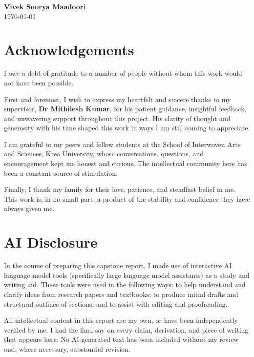 \documentclass[12pt, a4paper, oneside]{report}
\theoremstyle{plain}
\theoremstyle{definition}
\theoremstyle{remark}
\begin{document}
\vspace{3cm}

\noindent
\textbf{Vivek Soorya Maadoori}\\[0.3em]
\today

\clearpage
\thispagestyle{plain}
\chapter*{Acknowledgements}

I owe a debt of gratitude to a number of people without whom this work would not have been possible.

First and foremost, I wish to express my heartfelt and sincere thanks to my supervisor, \textbf{Dr Mithilesh Kumar}, for his patient guidance, insightful feedback, and unwavering support throughout this project. His clarity of thought and generosity with his time shaped this work in ways I am still coming to appreciate.

I am grateful to my peers and fellow students at the School of Interwoven Arts and Sciences, Krea University, whose conversations, questions, and encouragement kept me honest and curious. The intellectual community here has been a constant source of stimulation.

Finally, I thank my family for their love, patience, and steadfast belief in me. This work is, in no small part, a product of the stability and confidence they have always given me.

\clearpage
\thispagestyle{plain}
\chapter*{AI Disclosure}

In the course of preparing this capstone report, I made use of interactive AI language
model tools (specifically large language model assistants) as a study and writing aid.
These tools were used in the following ways: to help understand and clarify ideas from
research papers and textbooks; to produce initial drafts and structural outlines of
sections; and to assist with editing and proofreading.

All intellectual content in this report are my own, or have been independently verified by me.
I had the final say on every claim, derivation, and piece of writing that appears here.
No AI-generated text has been included without my review and, where necessary, substantial
revision. 
\end{document}

